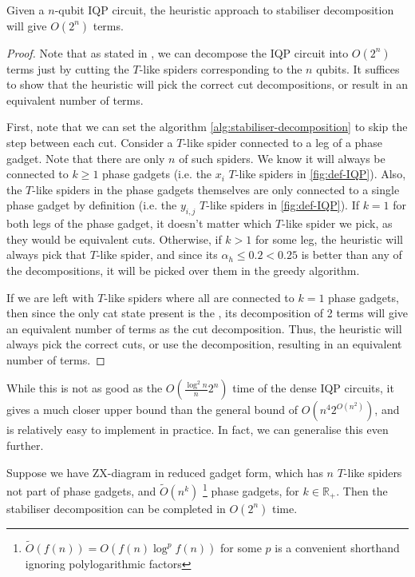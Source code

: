 \begin{lemma}
    Given a $n$-qubit IQP circuit, the heuristic approach to stabiliser decomposition
    will give $O(2^n)$ terms.
\end{lemma}

\begin{proof}
    Note that as stated in \cite{codsi2023}, we can decompose the IQP circuit into $O(2^n)$ terms
    just by cutting the $T$-like spiders corresponding to the $n$ qubits.
    It suffices to show that the heuristic will pick the correct cut decompositions,
    or result in an equivalent number of terms.

    First, note that we can set the algorithm \ref{alg:stabiliser-decomposition} 
    to skip the  step between each cut.
    Consider a $T$-like spider connected to a leg of a phase gadget.
    Note that there are only $n$ of such spiders.
    We know it will always be connected to $k \geq 1$ phase gadgets 
    (i.e. the $x_i$ $T$-like spiders in \autoref{fig:def-IQP}).
    Also, the $T$-like spiders in the phase gadgets themselves are only connected 
    to a single phase gadget by definition (i.e. the $y_{i,j}$ $T$-like spiders in \autoref{fig:def-IQP}).
    If $k=1$ for both legs of the phase gadget, it doesn't matter which $T$-like spider we pick, 
    as they would be equivalent cuts.
    Otherwise, if $k > 1$ for some leg, the heuristic will always pick that $T$-like spider, 
    and since its $\alpha_h \leq 0.2 < 0.25$
    is better than any of the  decompositions, 
    it will be picked over them in the greedy algorithm.

    If we are left with $T$-like spiders where all are connected to $k=1$ phase gadgets,
    then since the only cat state present is the ,
    its decomposition of 2 terms will give an equivalent number of terms as the cut decomposition.
    Thus, the heuristic will always pick the correct cuts, 
    or use the  decomposition, resulting in an equivalent number of terms.
\end{proof}

While this is not as good as the $O(\frac{\log^2 n}{n}2^{n})$ time of the dense IQP circuits,
it gives a much closer upper bound than the general bound of $O(n^4 2^{O(n^2)})$, 
and is relatively easy to implement in practice.
In fact, we can generalise this even further.

\begin{proposition}
    \label{prop:reduced-gadget-cut}
    Suppose we have ZX-diagram in reduced gadget form, 
    which has $n$ $T$-like spiders not part of phase gadgets,
    and $\tilde{O}(n^k)$
    \footnote{$\tilde{O}(f(n)) = O(f(n) \log^p f(n))$ for some $p$ is a convenient shorthand 
    ignoring polylogarithmic factors} 
    phase gadgets, for $k\in \mathbb{R}_+$.
    Then the stabiliser decomposition can be completed in $O(2^n)$ time.
\end{proposition}


